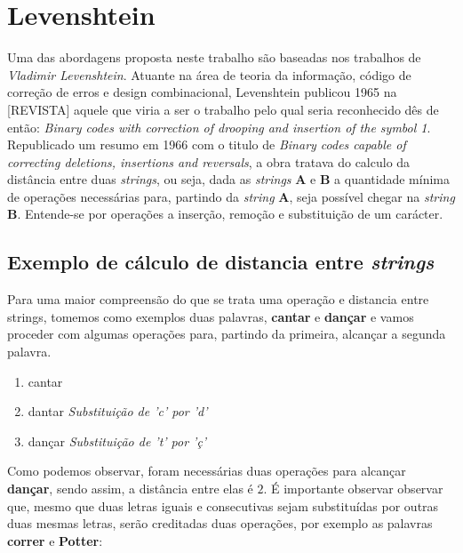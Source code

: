 \section{Levenshtein} %
\label{sec:leveinstein}

Uma das abordagens proposta neste trabalho são baseadas nos trabalhos de \textit{Vladimir Levenshtein}. Atuante na área de teoria da informação, código de correção de erros e design combinacional, Levenshtein publicou 1965 na [REVISTA] aquele que viria a ser o trabalho pelo qual seria reconhecido dês de então: \textit{Binary codes with correction of drooping and insertion of the symbol 1}\cite{levenshtein1965}. Republicado um resumo em 1966 com o titulo de \textit{Binary codes capable of correcting deletions, insertions and reversals}\cite{levenshtein1966}, a obra tratava do calculo da distância entre duas \textit{strings}, ou seja, dada as \textit{strings} \textbf{A} e \textbf{B} a quantidade mínima de operações necessárias para, partindo da \textit{string} \textbf{A}, seja possível chegar na \textit{string} \textbf{B}. Entende-se por operações a inserção, remoção e substituição de um carácter.

\subsection{Exemplo de cálculo de distancia entre \textit{strings}} %
\label{sub:exemplo_de_c_lculo_de_distancia_entre_it}

Para uma maior compreensão do que se trata uma operação e distancia entre strings, tomemos como exemplos duas palavras, \textbf{cantar} e \textbf{dançar} e vamos proceder com algumas operações para, partindo da primeira, alcançar a segunda palavra.


\begin{enumerate}[start=0]
	\item cantar
	\item dantar \textit{Substituição de 'c' por 'd'}
	\item dançar \textit{Substituição de 't' por 'ç'}
\end{enumerate}

Como podemos observar, foram necessárias duas operações para alcançar \textbf{dançar}, sendo assim, a distância entre elas é $2$.
É importante observar observar que, mesmo que duas letras iguais e consecutivas sejam substituídas por outras duas mesmas letras, serão creditadas duas operações, por exemplo as palavras \textbf{correr} e \textbf{Potter}:

